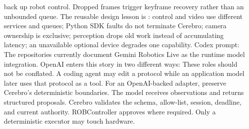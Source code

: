 {}back up robot control. Dropped frames trigger keyframe recovery rather than an\markdownRendererSoftLineBreak
{}unbounded queue.\markdownRendererParagraphSeparator
{}The reusable design lesson is :\markdownRendererInterblockSeparator
{}\markdownRendererUlBegin
\markdownRendererUlItem control and video use different services and queues;\markdownRendererUlItemEnd 
\markdownRendererUlItem Python SDK faults do not terminate Cerebro;\markdownRendererUlItemEnd 
\markdownRendererUlItem camera ownership is exclusive;\markdownRendererUlItemEnd 
\markdownRendererUlItem perception drops old work instead of accumulating latency;\markdownRendererUlItemEnd 
\markdownRendererUlItem an unavailable optional device degrades one capability.\markdownRendererUlItemEnd 
\markdownRendererUlEnd \markdownRendererInterblockSeparator
{}Codex prompt:\markdownRendererInterblockSeparator
{}\markdownRendererInterblockSeparator
{}\markdownRendererThematicBreak{}\markdownRendererInterblockSeparator
{}
\markdownRendererSectionEnd \markdownRendererSectionBegin
{}\markdownRendererInterblockSeparator
{}The repositories currently document Gemini Robotics Live as the runtime model\markdownRendererSoftLineBreak
{}integration. OpenAI enters this story in two different ways:\markdownRendererInterblockSeparator
{}\markdownRendererOlBegin
{}\markdownRendererOlItemEnd 
{}\markdownRendererOlItemEnd 
\markdownRendererOlEnd \markdownRendererInterblockSeparator
{}These roles should not be conflated. A coding agent may edit a protocol while\markdownRendererSoftLineBreak
{}an application model later uses that protocol as a tool.\markdownRendererParagraphSeparator
{}For an OpenAI-backed adapter, preserve Cerebro's deterministic boundaries. The\markdownRendererSoftLineBreak
{}model receives observations and returns structured proposals. Cerebro validates\markdownRendererSoftLineBreak
{}the schema, allow-list, session, deadline, and current authority. ROBController\markdownRendererSoftLineBreak
{}approves where required. Only a deterministic executor may touch hardware.\markdownRendererParagraphSeparator
